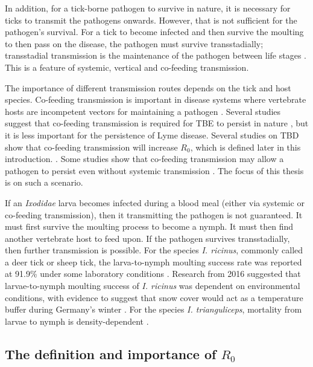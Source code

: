 \documentclass{article}
\begin{document}
In addition, for a tick-borne pathogen to survive in nature, it is necessary for ticks to transmit the pathogens onwards. However, that is not sufficient for the pathogen's survival. For a tick to become infected and then survive the moulting to then pass on the disease, the pathogen must survive transstadially; transstadial transmission is the maintenance of the pathogen between life stages \cite{Johnson2023d}. This is a feature of systemic, vertical and co-feeding transmission.

The importance of different transmission routes depends on the tick and host species. Co-feeding transmission is important in disease systems where vertebrate hosts are incompetent vectors for maintaining a pathogen \cite{HARRISON2012}. Several studies suggest that co-feeding transmission is required for TBE to persist in nature \cite{Hartemink2008, HARRISON2012}, but it is less important for the persistence of Lyme disease. Several studies on TBD show that co-feeding transmission will increase $ R_0 $, which is defined later in this introduction. \cite{JohnstoneRobertson2020, Rosa2003, Norman2004}. Some studies show that co-feeding transmission may allow a pathogen to persist even without systemic transmission \cite{Rosa2003, Norman2004}. The focus of this thesis is on such a scenario.

If an \textit{Ixodidae} larva becomes infected during a blood meal (either via systemic or co-feeding transmission), then it transmitting the pathogen is not guaranteed. It must first survive the moulting process to become a nymph. It must then find another vertebrate host to feed upon. If the pathogen survives transstadially, then further transmission is possible. For the species \textit{I. ricinus}, commonly called a deer tick or sheep tick, the larva-to-nymph moulting success rate was reported at 91.9\% under some laboratory conditions \cite{Hurry2021}. Research from 2016 suggested that larvae-to-nymph moulting success of \textit{I. ricinus} was dependent on environmental conditions, with evidence to suggest that snow cover would act as a temperature buffer during Germany's winter \cite{Dautel2016}. For the species \textit{I. trianguliceps}, mortality from larvae to nymph is density-dependent \cite{Randolph1994}.

\subsection{The definition and importance of \texorpdfstring{$ R_0 $}{R0}}
\end{document}
